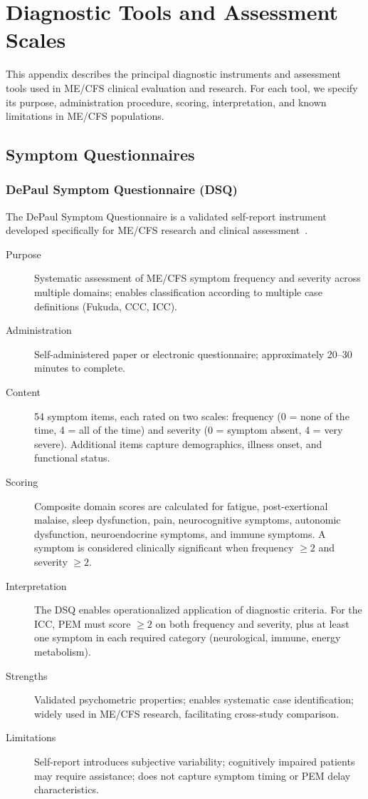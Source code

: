 \chapter{Diagnostic Tools and Assessment Scales}
\label{app:diagnostic-tools}

This appendix describes the principal diagnostic instruments and assessment tools used in ME/CFS clinical evaluation and research. For each tool, we specify its purpose, administration procedure, scoring, interpretation, and known limitations in ME/CFS populations.

\section{Symptom Questionnaires}
\label{sec:symptom-questionnaires}

\subsection{DePaul Symptom Questionnaire (DSQ)}

The DePaul Symptom Questionnaire is a validated self-report instrument developed specifically for ME/CFS research and clinical assessment~\cite{Jason2006}.

\begin{description}
\item[Purpose] Systematic assessment of ME/CFS symptom frequency and severity across multiple domains; enables classification according to multiple case definitions (Fukuda, CCC, ICC).
\item[Administration] Self-administered paper or electronic questionnaire; approximately 20--30 minutes to complete.
\item[Content] 54 symptom items, each rated on two scales: frequency (0 = none of the time, 4 = all of the time) and severity (0 = symptom absent, 4 = very severe). Additional items capture demographics, illness onset, and functional status.
\item[Scoring] Composite domain scores are calculated for fatigue, post-exertional malaise, sleep dysfunction, pain, neurocognitive symptoms, autonomic dysfunction, neuroendocrine symptoms, and immune symptoms. A symptom is considered clinically significant when frequency $\geq 2$ and severity $\geq 2$.
\item[Interpretation] The DSQ enables operationalized application of diagnostic criteria. For the ICC, PEM must score $\geq 2$ on both frequency and severity, plus at least one symptom in each required category (neurological, immune, energy metabolism).
\item[Strengths] Validated psychometric properties; enables systematic case identification; widely used in ME/CFS research, facilitating cross-study comparison.
\item[Limitations] Self-report introduces subjective variability; cognitively impaired patients may require assistance; does not capture symptom timing or PEM delay characteristics.
\end{description}

